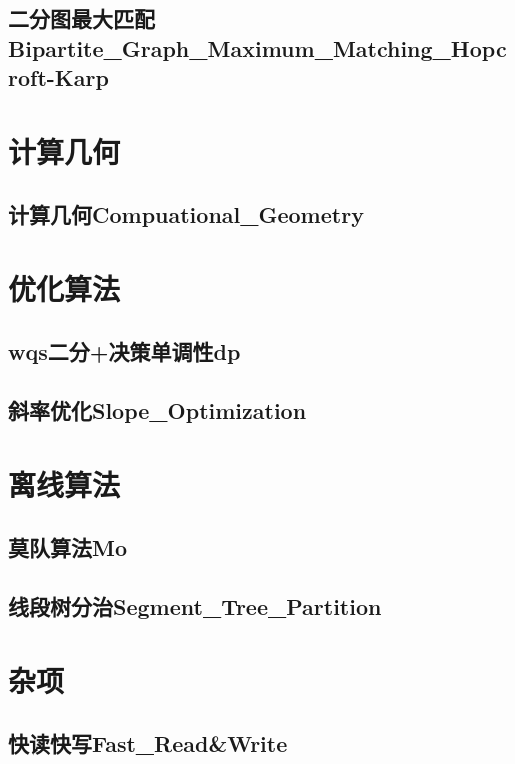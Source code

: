 \documentclass[10pt,a4paper]{article}
\begin{document}
\subsection{二分图最大匹配Bipartite\_Graph\_Maximum\_Matching\_Hopcroft-Karp}


\newpage
\section{计算几何}
\subsection{计算几何Compuational\_Geometry}


\newpage
\section{优化算法}
\subsection{wqs二分+决策单调性dp}

\subsection{斜率优化Slope\_Optimization}


\newpage
\section{离线算法}
\subsection{莫队算法Mo}

\subsection{线段树分治Segment\_Tree\_Partition}


\newpage
\section{杂项}
\subsection{快读快写Fast\_Read\&Write}

\end{document}
